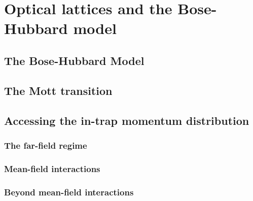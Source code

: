 \chapter{Optical lattices and the Bose-Hubbard model}

\section{The Bose-Hubbard Model}

\section{The Mott transition}

\section{Accessing the in-trap momentum distribution}

\subsection{The far-field regime}

\subsection{Mean-field interactions}

\subsection{Beyond mean-field interactions}

